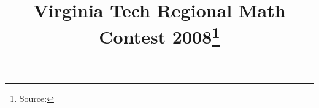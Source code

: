 \documentclass[10pt]{article}
\begin{document}
\title{Virginia Tech Regional Math Contest 2008\footnote{Source: \source}}
\author{\vspace{-2ex}}
\date{\vspace{-6ex}} %
\maketitle







\end{document}
